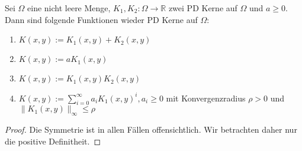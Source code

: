 \begin{theorem}
Sei $\Omega$ eine nicht leere Menge, $K_1, K_2:\Omega \rightarrow \mathbb{R}$ zwei \ac{PD} Kerne auf $\Omega$ und $a \geq 0$. Dann sind folgende Funktionen wieder \ac{PD} Kerne auf $\Omega$:
\begin{enumerate}
\item
$K(x,y) := K_1(x,y) + K_2(x,y)$
\item
$K(x,y) := aK_1 (x,y)$
\item
$K(x,y) := K_1(x,y)K_2(x,y)$
\item
$K(x,y) := \sum_{i=0}^\infty a_i K_1(x,y)^i, a_i \geq 0$ mit Konvergenzradius $\rho > 0$ und $ \| K_1 (x,y) \|_\infty \leq \rho$
\end{enumerate}
\end{theorem}
\begin{proof}
Die Symmetrie ist in allen Fällen offensichtlich. Wir betrachten daher nur die positive Definitheit.


\end{proof}
